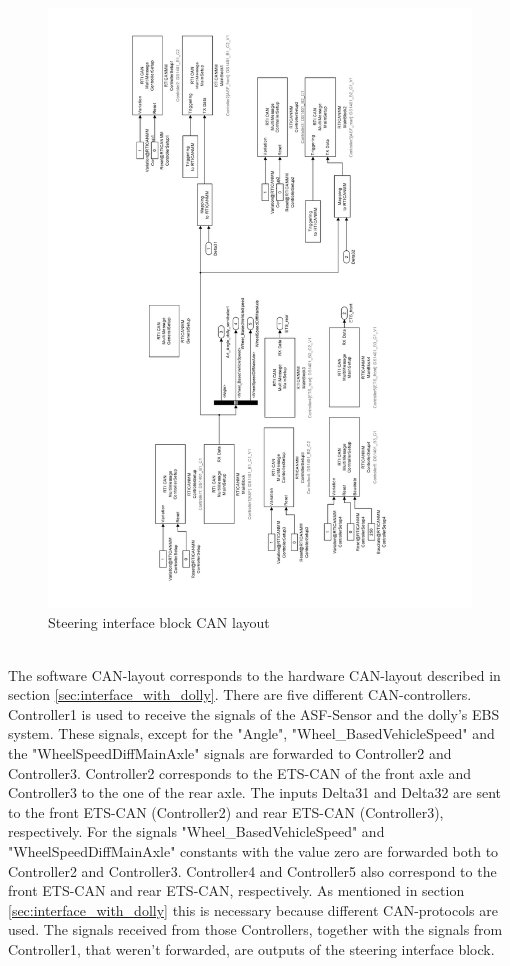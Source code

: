 \documentclass[ExampleMasters.tex]{subfiles}
\begin{document}
 \begin{figure}[h]
 	\centering
 	\includegraphics[width=1\linewidth]{figures/steering_interface_inside}
 	
 	\caption{Steering interface block CAN layout}
 	\label{fig:steering_interface_inside_pdf}
 \end{figure} \\
 
 The software CAN-layout corresponds to the hardware CAN-layout described in section \ref{sec:interface_with_dolly}. There are five different CAN-controllers. Controller1 is used to receive the signals of the ASF-Sensor and the dolly's EBS system. These signals, except for the "Angle", "Wheel\_BasedVehicleSpeed" and the "WheelSpeedDiffMainAxle" signals are forwarded to Controller2 and Controller3. Controller2 corresponds to the ETS-CAN of the front axle and Controller3 to the one of the rear axle. The inputs Delta31 and Delta32 are sent to the front ETS-CAN (Controller2) and rear ETS-CAN (Controller3), respectively. For the signals "Wheel\_BasedVehicleSpeed" and  "WheelSpeedDiffMainAxle" constants with the value zero are forwarded both to Controller2 and Controller3.
 Controller4 and Controller5 also correspond to the front ETS-CAN and rear ETS-CAN, respectively. As mentioned in section \ref{sec:interface_with_dolly} this is necessary because different CAN-protocols are used. The signals received from those Controllers, together with the signals from Controller1, that weren't forwarded, are outputs of the steering interface block.
  
\end{document}
